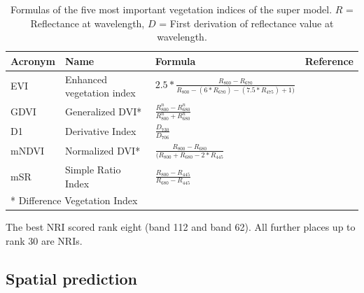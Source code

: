 \documentclass[review]{elsarticle}
\begin{document}
\begin{table}[t!]
\centering
\caption[t]{Formulas of the five most important vegetation indices of the super model. $R$ = Reflectance at wavelength, $D$ = First derivation of reflectance value at wavelength.}
\begingroup\footnotesize
\begin{tabular}{llll}
	\\
	Acronym & Name                      & Formula                                                            & Reference                                                 \\
	\hline
	EVI     & Enhanced vegetation index & $2.5*\frac{R_{800}-R_{670}}{R_{800}-(6*R_{670})-(7.5*R_{475})+1)}$ & \cite{hueteComparisonVegetationIndices1997}               \\
	GDVI    & Generalized DVI*          & $\frac{R_{800}^n-R_{680}^n}{R_{800}^n+R_{680}^n}$                  & \cite{wuEstimatingChlorophyllContent2008}                 \\
	D1      & Derivative Index          & $\frac{D_{730}}{D_{706}}$                                          & \cite{zarco-tejadaSteadystateChlorophyllFluorescence2003} \\
	mNDVI   & Normalized DVI*           & $  \frac{R_{800}-R_{680}}{(R_{800}+R_{680}-2*R_{445}}$             & \cite{simsRelationshipsLeafPigment2002}                   \\
	mSR     & Simple Ratio Index        & $\frac{R_{800}-R_{445}}{R_{680}-R_{445}}$                          & \cite{simsRelationshipsLeafPigment2002}                   \\
	\bottomrule
	\multicolumn{2}{l}{\small{* Difference Vegetation Index}}
\end{tabular}
\endgroup
\label{tab:most_imp_vars}
\end{table}

\noindent The best NRI scored rank eight (band 112 and band 62).
All further places up to rank 30 are NRIs.

\subsection{Spatial prediction}
\end{document}
